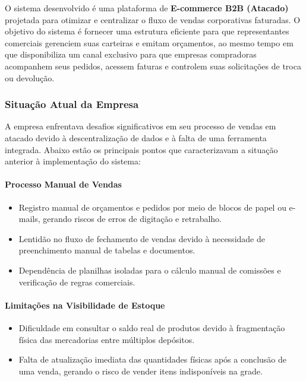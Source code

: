 \documentclass[12pt,a4paper]{article}
\begin{document}
O sistema desenvolvido é uma plataforma de \textbf{E-commerce B2B (Atacado)} projetada para otimizar e centralizar o fluxo de vendas corporativas faturadas. O objetivo do sistema é fornecer uma estrutura eficiente para que representantes comerciais gerenciem suas carteiras e emitam orçamentos, ao mesmo tempo em que disponibiliza um canal exclusivo para que empresas compradoras acompanhem seus pedidos, acessem faturas e controlem suas solicitações de troca ou devolução.

\subsubsection{Situação Atual da Empresa}

A empresa enfrentava desafios significativos em seu processo de vendas em atacado devido à descentralização de dados e à falta de uma ferramenta integrada. Abaixo estão os principais pontos que caracterizavam a situação anterior à implementação do sistema:

\paragraph*{Processo Manual de Vendas}
\begin{itemize}
  \item Registro manual de orçamentos e pedidos por meio de blocos de papel ou e-mails, gerando riscos de erros de digitação e retrabalho.
  \item Lentidão no fluxo de fechamento de vendas devido à necessidade de preenchimento manual de tabelas e documentos.
  \item Dependência de planilhas isoladas para o cálculo manual de comissões e verificação de regras comerciais.
\end{itemize}

\paragraph*{Limitações na Visibilidade de Estoque}
\begin{itemize}
  \item Dificuldade em consultar o saldo real de produtos devido à fragmentação física das mercadorias entre múltiplos depósitos.
  \item Falta de atualização imediata das quantidades físicas após a conclusão de uma venda, gerando o risco de vender itens indisponíveis na grade.
\end{itemize}
\end{document}
